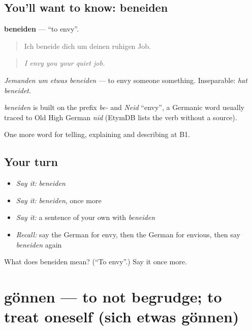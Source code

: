 \subsection*{You'll want to know: beneiden}
\textbf{beneiden} — \textquotedblleft{}to envy\textquotedblright{}.

\begin{quote}
Ich beneide dich um deinen ruhigen Job.
\end{quote}

\begin{quote}
\emph{I envy you your quiet job.}
\end{quote}

\emph{Jemanden um etwas beneiden} — to envy someone something. Inseparable: \emph{hat beneidet}.

\begin{cousinweb}
\emph{beneiden} is built on the prefix \emph{be-} and \emph{Neid} \textquotedblleft{}envy\textquotedblright{}, a Germanic word usually traced to Old High German \emph{nīd} (EtymDB lists the verb without a source).
\end{cousinweb}

\begin{grammarlens}[title={What you've built}]
One more word for telling, explaining and describing at B1.
\end{grammarlens}

\subsection*{Your turn}
\begin{itemize}
\raggedright
  \item \emph{Say it:} \emph{beneiden}
  \item \emph{Say it:} \emph{beneiden}, once more
  \item \emph{Say it:} a sentence of your own with \emph{beneiden}
  \item \emph{Recall:} say the German for envy, then the German for envious, then say \emph{beneiden} again
\end{itemize}

\begin{tcolorbox}[breakable,colback=teal!4,colframe=teal!35!black,title={Before you move on}]
What does beneiden mean? (\textquotedblleft{}To envy\textquotedblright{}.) Say it once more.
\end{tcolorbox}
\section[gönnen]{gönnen — to not begrudge; to treat oneself (sich etwas gönnen)}

